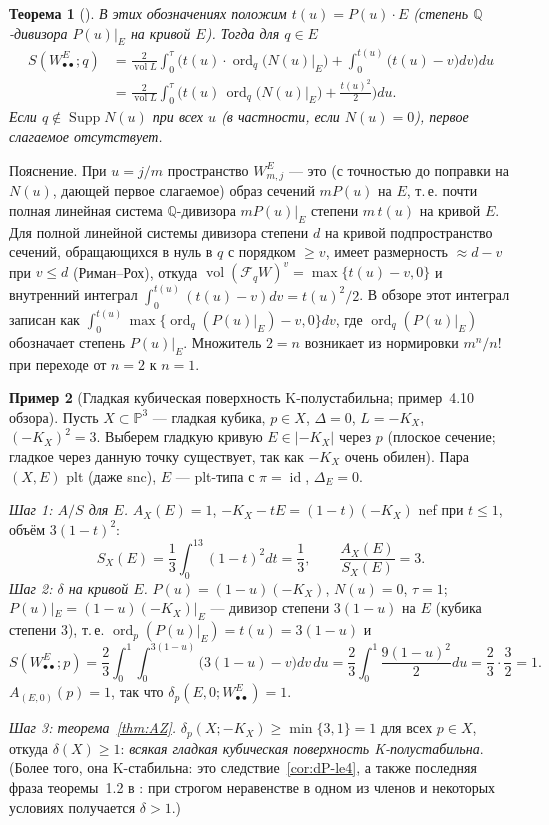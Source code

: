 \documentclass[11pt,a4paper]{article}
\theoremstyle{plain}
\newtheorem{theorem}{Теорема}[section]
\theoremstyle{definition}
\newtheorem{example}[theorem]{Пример}
\theoremstyle{remark}
\newcommand{\Q}{\mathbb{Q}}
\newcommand{\PP}{\mathbb{P}}
\DeclareMathOperator{\ord}{ord}
\DeclareMathOperator{\id}{id}
\DeclareMathOperator{\vol}{vol}
\DeclareMathOperator{\Supp}{Supp}
\begin{document}
\begin{theorem}[{\cite[1.106]{ACCFKMSV}}]\label{thm:AZ-surface}
В этих обозначениях положим $t(u)=P(u)\cdot E$ \textup{(}степень $\Q$-дивизора $P(u)|_E$ на кривой $E$\textup{)}.
Тогда для $q\in E$
\begin{align*}
S(W^E_{\bullet\bullet};q)&=\frac2{\vol L}\int_0^\tau\Big(t(u)\cdot\ord_q\big(N(u)|_E\big)
+\int_0^{t(u)}\big(t(u)-v\big)dv\Big)du\\
&=\frac2{\vol L}\int_0^\tau\Big(t(u)\,\ord_q\big(N(u)|_E\big)+\frac{t(u)^2}2\Big)du .
\end{align*}
Если $q\notin\Supp N(u)$ при всех $u$ \textup{(}в частности, если $N(u)=0$\textup{)}, первое слагаемое отсутствует.
\end{theorem}

Пояснение. При $u=j/m$ пространство $W^E_{m,j}$ --- это (с точностью до поправки на $N(u)$, дающей
первое слагаемое) образ сечений $mP(u)$ на $E$, т.\,е. почти полная линейная система $\Q$-дивизора
$mP(u)|_E$ степени $m\,t(u)$ на кривой $E$. Для полной линейной системы дивизора степени $d$ на
кривой подпространство сечений, обращающихся в нуль в $q$ с порядком $\ge v$, имеет размерность
$\approx d-v$ при $v\le d$ (Риман--Рох), откуда $\vol(\mathcal F_qW)^v=\max\{t(u)-v,0\}$ и
внутренний интеграл $\int_0^{t(u)}(t(u)-v)dv=t(u)^2/2$. В обзоре этот интеграл записан как
$\int_0^{t(u)}\max\{\ord_q(P(u)|_E)-v,0\}dv$, где $\ord_q(P(u)|_E)$ обозначает степень $P(u)|_E$.
Множитель $2=n$ возникает из нормировки $m^n/n!$ при переходе от $n=2$ к $n=1$.

\begin{example}[Гладкая кубическая поверхность K-полустабильна; пример~4.10 обзора]\label{ex:AZ-cubic}
Пусть $X\subset\PP^3$ --- гладкая кубика, $p\in X$, $\Delta=0$, $L=-K_X$, $(-K_X)^2=3$. Выберем
гладкую кривую $E\in|-K_X|$ через $p$ (плоское сечение; гладкое через данную точку существует, так
как $-K_X$ очень обилен). Пара $(X,E)$ plt (даже snc), $E$ --- plt-типа с $\pi=\id$, $\Delta_E=0$.

\emph{Шаг 1: $A/S$ для $E$.} $A_X(E)=1$, $-K_X-tE=(1-t)(-K_X)$ nef при $t\le1$, объём $3(1-t)^2$:
\[
S_X(E)=\frac13\int_0^13(1-t)^2dt=\frac13,\qquad\frac{A_X(E)}{S_X(E)}=3 .
\]
\emph{Шаг 2: $\delta$ на кривой $E$.} $P(u)=(1-u)(-K_X)$, $N(u)=0$, $\tau=1$;
$P(u)|_E=(1-u)(-K_X)|_E$ --- дивизор степени $3(1-u)$ на $E$ (кубика степени 3), т.\,е.
$\ord_p(P(u)|_E)=t(u)=3(1-u)$ и
\[
S(W^E_{\bullet\bullet};p)=\frac23\int_0^1\int_0^{3(1-u)}\big(3(1-u)-v\big)dv\,du
=\frac23\int_0^1\frac{9(1-u)^2}2du=\frac23\cdot\frac32=1 .
\]
$A_{(E,0)}(p)=1$, так что $\delta_p(E,0;W^E_{\bullet\bullet})=1$.

\emph{Шаг 3: теорема~\ref{thm:AZ}.} $\delta_p(X;-K_X)\ge\min\{3,1\}=1$ для всех $p\in X$, откуда
$\delta(X)\ge1$: \emph{всякая гладкая кубическая поверхность K-полустабильна}. (Более того,
она K-стабильна: это следствие~\ref{cor:dP-le4}, а также последняя фраза теоремы~1.2 в \cite{AZ}:
при строгом неравенстве в одном из членов и некоторых условиях получается $\delta>1$.)
\end{example}
\end{document}

